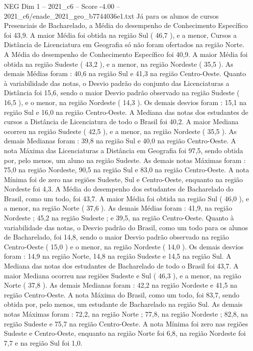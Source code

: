\begin{textsample}{NEG Dim 1 – 2021\_c6 – Score -4.00 – 2021\_c6/enade\_2021\_geo\_b7744036e1.txt}
Já para os alunos de cursos Presenciais de Bacharelado, a Média do desempenho de Conhecimento Específico foi 43,9.
A maior Média foi obtida na região Sul ( 46,7 ), e a menor, Cursos a Distância de Licenciatura em Geografia só não foram ofertados na região Norte.
A Média do desempenho de Conhecimento Específico foi 40,9.
A maior Média foi obtida na região Sudeste ( 43,2 ), e a menor, na região Nordeste ( 35,5 ).
As demais Médias foram : 40,6 na região Sul e 41,3 na região Centro-Oeste.
Quanto à variabilidade das notas, o Desvio padrão do conjunto das Licenciaturas a Distância foi 15,6, sendo o maior Desvio padrão observado na região Sudeste ( 16,5 ), e o menor, na região Nordeste ( 14,3 ).
Os demais desvios foram : 15,1 na região Sul e 16,0 na região Centro-Oeste.
A Mediana das notas dos estudantes de cursos a Distância de Licenciatura de todo o Brasil foi 40,2.
A maior Mediana ocorreu na região Sudeste ( 42,5 ), e a menor, na região Nordeste ( 35,5 ).
As demais Medianas foram : 39,8 na região Sul e 40,0 na região Centro-Oeste.
A nota Máxima das Licenciaturas a Distância em Geografia foi 97,5, sendo obtida por, pelo menos, um aluno na região Sudeste.
As demais notas Máximas foram : 75,0 na região Nordeste, 90,5 na região Sul e 83,0 na região Centro-Oeste.
A nota Mínima foi de zero nas regiões Sudeste, Sul e Centro-Oeste, enquanto na região Nordeste foi 4,3.
A Média do desempenho dos estudantes de Bacharelado do Brasil, como um todo, foi 43,7.
A maior Média foi obtida na região Sul ( 46,0 ), e a menor, na região Norte ( 37,6 ).
As demais Médias foram : 41,9, na região Nordeste ; 45,2 na região Sudeste ; e 39,5, na região Centro-Oeste.
Quanto à variabilidade das notas, o Desvio padrão do Brasil, como um todo para os alunos de Bacharelado, foi 14,8, sendo o maior Desvio padrão observado na região Centro-Oeste ( 15,0 ) e o menor, na região Nordeste ( 14,0 ).
Os demais desvios foram : 14,9 na região Norte, 14,8 na região Sudeste e 14,5 na região Sul.
A Mediana das notas dos estudantes de Bacharelado de todo o Brasil foi 43,7.
A maior Mediana ocorreu nas regiões Sudeste e Sul ( 46,3 ), e a menor, na região Norte ( 37,8 ).
As demais Medianas foram : 42,2 na região Nordeste e 41,5 na região Centro-Oeste.
A nota Máxima do Brasil, como um todo, foi 83,7, sendo obtida por, pelo menos, um estudante de Bacharelado na região Sul.
As demais notas Máximas foram : 72,2, na região Norte ; 77,8, na região Nordeste ; 82,8, na região Sudeste e 75,7 na região Centro-Oeste.
A nota Mínima foi zero nas regiões Sudeste e Centro-Oeste, enquanto na região Norte foi 6,8, na região Nordeste foi 7,7 e na região Sul foi 1,0.

\end{textsample}
